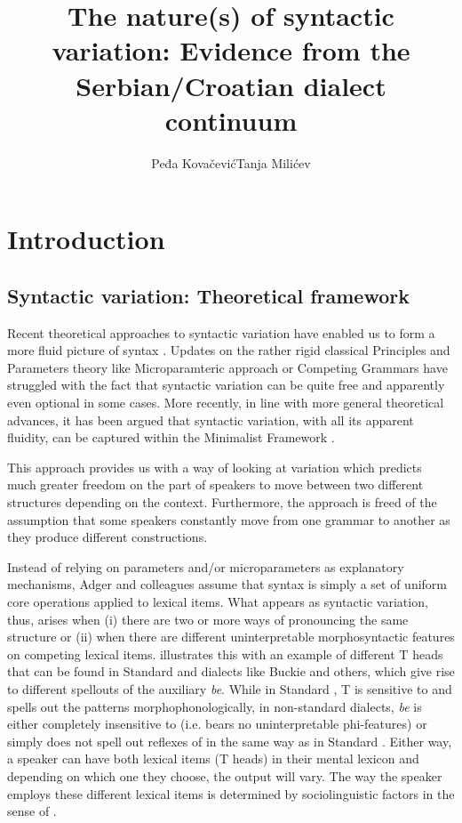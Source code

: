 \documentclass[output=paper,modfonts,newtxmath,hidelinks,]{langscibook}
\title{The nature(s) of syntactic variation: Evidence from the Serbian/Croatian dialect continuum}
\author{Peđa Kovačević\affiliation{University of Novi Sad}\lastand  Tanja Milićev\affiliation{University of Novi Sad}}
\begin{document}
\maketitle
{}

\section{Introduction}\label{7:s1}

\subsection{Syntactic variation: {T}heoretical framework}\label{7:s1.1}

Recent theoretical approaches to syntactic variation have enabled us to form a more fluid picture of syntax \citep{Adger2006,AdgerTrousdale2007,AdgerSmith2005}. Updates on the rather rigid classical Principles and Parameters theory \citep{ChomskyLasnik1995} like   Microparamteric approach or  Competing Grammars have struggled with the fact that syntactic variation can be quite free and apparently even optional in some cases. More recently, in line with more general theoretical advances, it has been argued that syntactic variation, with all its apparent fluidity, can be captured within the Minimalist Framework \citep{Adger2006,AdgerTrousdale2007,AdgerSmith2005}.

This approach provides us with a way of looking at variation which predicts much greater freedom on the part of speakers to move between two different structures depending on the context. Furthermore, the approach is freed of the assumption that some speakers constantly move from one grammar to another as they produce different constructions.\largerpage[2]

Instead of relying on parameters and/or microparameters as explanatory mechanisms, Adger and colleagues assume that syntax is simply a set of uniform core operations applied to lexical items. What appears as syntactic variation, thus, arises when (i) there are two or more ways of pronouncing the same structure or (ii) when there are different uninterpretable morphosyntactic features on competing lexical items. \citet{Adger2006} illustrates this with an example of different T heads that can be found in Standard  and dialects like Buckie  and others, which give rise to different spellouts of the auxiliary \textit{be}. While in Standard , T is sensitive to  and spells out the  patterns morphophonologically, in non-standard dialects, \textit{be} is either completely insensitive to  (i.e. bears no uninterpretable phi-features) or simply does not spell out reflexes of  in the same way as in Standard . Either way, a speaker can have both lexical items (T heads) in their mental lexicon and depending on which one they choose, the output will vary. The way the speaker employs these different lexical items is determined by sociolinguistic factors in the sense of \citet{Labov1972}.
\end{document}
